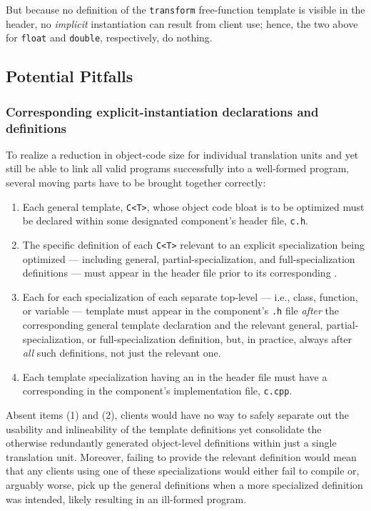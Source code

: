 \noindent But because no definition of the \lstinline!transform! free-function
template is visible in the header, no \emph{implicit} instantiation can
result from client use; hence, the two  above for \lstinline!float! and \lstinline!double!,
respectively, do nothing.

\subsection[Potential Pitfalls]{Potential Pitfalls}\label{potential-pitfalls-externtemplate}

\subsubsection[Corresponding explicit-instantiation declarations and definitions]{Corresponding explicit-instantiation declarations and definitions}\label{corresponding-explicit-instantiation-declarations-and-definitions}

To realize a reduction in object-code size for individual translation
units and yet still be able to link all valid programs successfully into
a well-formed program, several moving parts have to be brought together
correctly:
\begin{enumerate}
\item{Each general template, \lstinline!C<T>!, whose object code bloat is to be optimized must be declared within some designated component’s header file, \lstinline!c.h!.}
\item{The specific definition of each \lstinline!C<T>! relevant to an explicit specialization being optimized — including general, partial-specialization, and full-specialization definitions — must appear in the header file prior to its corresponding .}
\item{Each  for each specialization of each separate top-level — i.e., class, function, or variable — template must appear in the component’s \lstinline!.h! file \emph{after} the corresponding general template declaration and the relevant general, partial-specialization, or full-specialization definition, but, in practice, always after \emph{all} such definitions, not just the relevant one.}
\item{Each template specialization having an  in the header file must have a corresponding  in the component’s implementation file, \lstinline!c.cpp!.}
\end{enumerate}
Absent items (1) and (2), clients would have no way to safely separate
out the usability and inlineability of the template definitions yet
consolidate the otherwise redundantly generated object-level definitions
within just a single translation unit. Moreover, failing to provide the
relevant definition would mean that any clients using one of these
specializations would either fail to compile or, arguably worse, pick up
the general definitions when a more specialized definition was intended,
likely resulting in an ill-formed program.

